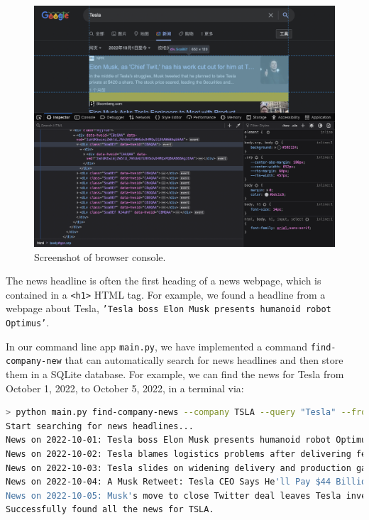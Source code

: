 \documentclass[a4paper, 11pt]{my-elegantpaper}
\begin{document}
\begin{figure}[H]
    \centering
    \includegraphics[scale=0.4]{figures/weblink.png}
    \caption{Screenshot of browser console.}
    \label{fig:8}
\end{figure}

The news headline is often the first heading of a news webpage, which is contained in a \texttt{<h1>} HTML tag. For example, we found a headline from a webpage about Tesla, \texttt{'Tesla boss Elon Musk presents humanoid robot Optimus'}.

In our command line app \texttt{main.py}, we have implemented a command \texttt{find-company-new} that can automatically search for news headlines and then store them in a SQLite database. For example, we can find the news for Tesla from October 1, 2022, to October 5, 2022, in a terminal via:
\begin{lstlisting}[language=sh]
> python main.py find-company-news --company TSLA --query "Tesla" --from-date "2022-10-1" --to-date "2022-10-5" --force
Start searching for news headlines...
News on 2022-10-01: Tesla boss Elon Musk presents humanoid robot Optimus
News on 2022-10-02: Tesla blames logistics problems after delivering fewer cars than forecast
News on 2022-10-03: Tesla slides on widening delivery and production gap, demand worries
News on 2022-10-04: A Musk Retweet: Tesla CEO Says He'll Pay $44 Billion to Buy Twitter
News on 2022-10-05: Musk's move to close Twitter deal leaves Tesla investors worried
Successfully found all the news for TSLA.
\end{lstlisting}
\end{document}
